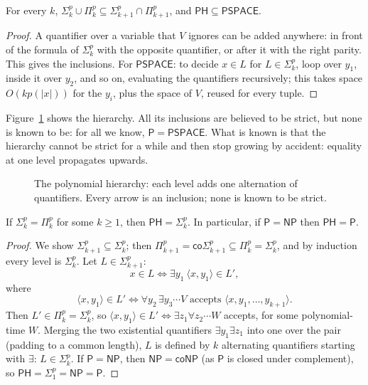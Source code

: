 \begin{proposition}\label{prop:phbasic}
For every $k$, $\Sigma_k^p\cup\Pi_k^p\subseteq\Sigma_{k+1}^p\cap\Pi_{k+1}^p$, and $\mathsf{PH}\subseteq\mathsf{PSPACE}$.
\end{proposition}

\begin{proof}
A quantifier over a variable that $V$ ignores can be added anywhere: in front of the formula of $\Sigma_k^p$ with the opposite quantifier, or after it with the right parity. This gives the inclusions. For $\mathsf{PSPACE}$: to decide $x\in L$ for $L\in\Sigma_k^p$, loop over $y_1$, inside it over $y_2$, and so on, evaluating the quantifiers recursively; this takes space $O(kp(|x|))$ for the $y_i$, plus the space of $V$, reused for every tuple.
\end{proof}

Figure~\ref{fig:hierarchy} shows the hierarchy. All its inclusions are believed to be strict, but none is known to be: for all we know, $\mathsf P=\mathsf{PSPACE}$. What is known is that the hierarchy cannot be strict for a while and then stop growing by accident: equality at one level propagates upwards.

\begin{figure}[ht]
\centering
{}
\caption{The polynomial hierarchy: each level adds one alternation of quantifiers. Every arrow is an inclusion; none is known to be strict.}
\label{fig:hierarchy}
\end{figure}

\begin{theorem}\label{thm:collapse}
If $\Sigma_k^p=\Pi_k^p$ for some $k\ge1$, then $\mathsf{PH}=\Sigma_k^p$. In particular, if $\mathsf P=\mathsf{NP}$ then $\mathsf{PH}=\mathsf P$.
\end{theorem}

\begin{proof}
We show $\Sigma_{k+1}^p\subseteq\Sigma_k^p$; then $\Pi_{k+1}^p=\mathsf{co}\Sigma_{k+1}^p\subseteq\Pi_k^p=\Sigma_k^p$, and by induction every level is $\Sigma_k^p$. Let $L\in\Sigma_{k+1}^p$:
\[
x\in L\iff\exists y_1\ \langle x,y_1\rangle\in L',
\]
where
\[
\langle x,y_1\rangle\in L'\iff\forall y_2\,\exists y_3\cdots V\text{ accepts }\langle x,y_1,\dots,y_{k+1}\rangle.
\]
Then $L'\in\Pi_k^p=\Sigma_k^p$, so $\langle x,y_1\rangle\in L'\iff\exists z_1\forall z_2\cdots W$ accepts, for some polynomial-time $W$. Merging the two existential quantifiers $\exists y_1\exists z_1$ into one over the pair (padding to a common length), $L$ is defined by $k$ alternating quantifiers starting with $\exists$: $L\in\Sigma_k^p$. If $\mathsf P=\mathsf{NP}$, then $\mathsf{NP}=\mathsf{coNP}$ (as $\mathsf P$ is closed under complement), so $\mathsf{PH}=\Sigma_1^p=\mathsf{NP}=\mathsf P$.
\end{proof}

